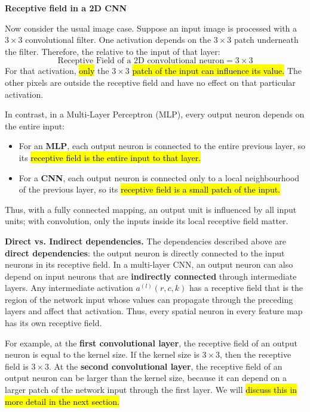\highspace
\begin{flushleft}
    \textcolor{Green3}{ \textbf{Receptive field in a 2D CNN}}
\end{flushleft}
Now consider the usual image case. Suppose an input image is processed with a $3 \times 3$ convolutional filter. One activation depends on the $3 \times 3$ patch underneath the filter. Therefore, the relative to the input of that layer:
\begin{equation*}
    \text{Receptive Field of a 2D convolutional neuron} = 3 \times 3
\end{equation*}
For that activation, \hl{only} the $3 \times 3$ \hl{patch of the input can influence its value.} The other pixels are outside the receptive field and have no effect on that particular activation.

\highspace
In contrast, in a Multi-Layer Perceptron (MLP), every output neuron depends on the entire input:
\begin{itemize}
    \item For an \textbf{MLP}, each output neuron is connected to the entire previous layer, so its \hl{receptive field is the entire input to that layer.}
    \item For a \textbf{CNN}, each output neuron is connected only to a local neighbourhood of the previous layer, so its \hl{receptive field is a small patch of the input.}
\end{itemize}
Thus, with a fully connected mapping, an output unit is influenced by all input units; with convolution, only the inputs inside its local receptive field matter.

\highspace
\textcolor{Green3}{ \textbf{Direct vs. Indirect dependencies.}}
The dependencies described above are \textbf{direct dependencies}: the output neuron is directly connected to the input neurons in its receptive field. In a multi-layer CNN, an output neuron can also depend on input neurons that are \textbf{indirectly connected} through intermediate layers. Any intermediate activation $a^{(l)}(r,c,k)$ has a receptive field that is the region of the network input whose values can propagate through the preceding layers and affect that activation. Thus, every spatial neuron in every feature map has its own receptive field.

\highspace
For example, at the \textbf{first convolutional layer}, the receptive field of an output neuron is equal to the kernel size. If the kernel size is $3 \times 3$, then the receptive field is $3 \times 3$. At the \textbf{second convolutional layer}, the receptive field of an output neuron can be larger than the kernel size, because it can depend on a larger patch of the network input through the first layer. We will \hl{discuss this in more detail in the next section.}

